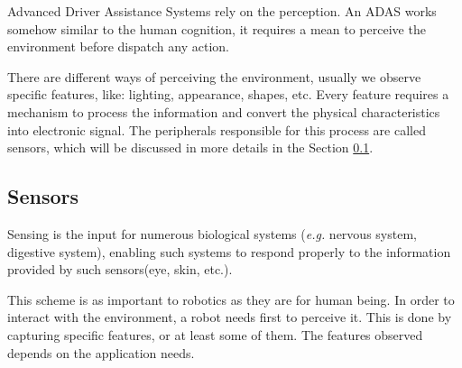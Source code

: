 Advanced Driver Assistance Systems rely on the perception. An ADAS works somehow similar to the human cognition, it requires a mean to perceive the environment before dispatch any action. 

There are different ways of perceiving the environment, usually we observe specific features, like: lighting, appearance, shapes, etc. Every feature requires a mechanism to process the information and convert the physical characteristics into electronic signal. The peripherals responsible for this process are called sensors, which will be discussed in more details in the Section \ref{sec:sensors}.


\subsection{Sensors}
\label{sec:sensors}


Sensing is the input for numerous biological systems (\textit{e.g.} nervous system, digestive system), enabling such systems to respond properly to the information provided by such sensors(eye, skin, etc.). 

This scheme is as important to robotics as they are for human being. In order to interact with the environment, a robot needs first to perceive it. This is done by capturing specific features, or at least some of them. The features observed depends on the application needs.

